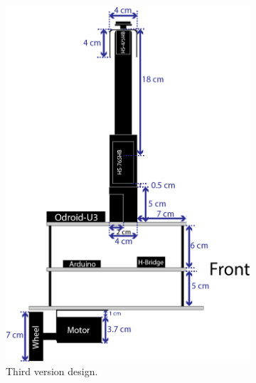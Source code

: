 \begin{figure}
\begin{subfigure}[c]{0.3\textwidth}
	\includegraphics[width=\textwidth]{./Images/upperFourthD.png}
	\caption{Third version design.}
	\label{fig:triskar-third-design}
	\end{subfigure}
	\begin{subfigure}[c]{0.3\textwidth}
	\centering

\end{subfigure}
\end{figure}
